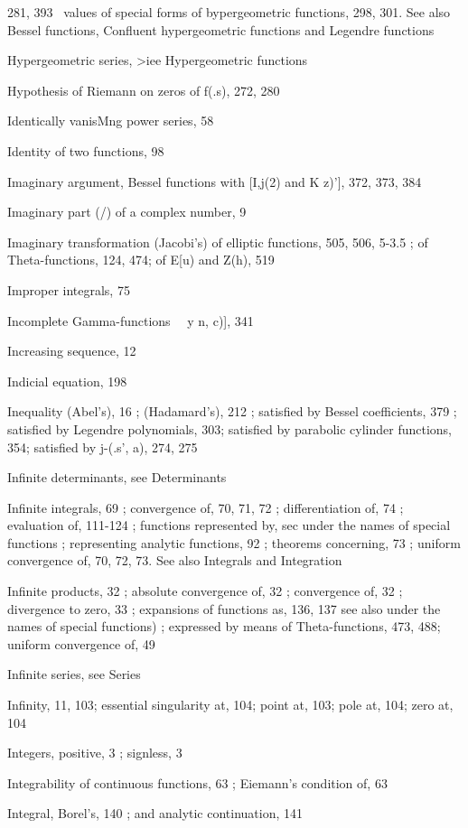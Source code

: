 281, 393 \ values of special forms of bypergeometric functions, 298, 301. See also Bessel
functions, Confluent hypergeometric functions and Legendre functions

Hypergeometric series, >iee Hypergeometric functions

Hypothesis of Riemann on zeros of f(.s), 272, 280

Identically vanisMng power series, 58

Identity of two functions, 98

Imaginary argument, Bessel functions with [I,j(2) and K  z)'], 372, 373, 384

Imaginary part (/) of a complex number, 9

Imaginary transformation (Jacobi's) of elliptic functions, 505, 506, 5-3.5 ; of Theta-functions, 124,
474; of E[u) and Z(h), 519

Improper integrals, 75

Incomplete Gamma-functions \ \  y n, c)], 341

Increasing sequence, 12

Indicial equation, 198

Inequality (Abel's), 16 ; (Hadamard's), 212 ; satisfied by Bessel coefficients, 379 ; satisfied by
Legendre polynomials, 303; satisfied by parabolic cylinder functions, 354; satisfied by
j-(.s', a), 274, 275

Infinite determinants, see Determinants

Infinite integrals, 69 ; convergence of, 70, 71, 72 ; differentiation of, 74 ; evaluation of, 111-124 ;
functions represented by, sec under the names of special functions ; representing analytic
functions, 92 ; theorems concerning, 73 ; uniform convergence of, 70, 72, 73. See also
Integrals and Integration

Infinite products, 32 ; absolute convergence of, 32 ; convergence of, 32 ; divergence to zero, 33 ;
expansions of functions as, 136, 137  see also under the names of special functions) ; expressed
by means of Theta-functions, 473, 488; uniform convergence of, 49

Infinite series, see Series

Infinity, 11, 103; essential singularity at, 104; point at, 103; pole at, 104; zero at, 104

Integers, positive, 3 ; signless, 3

Integrability of continuous functions, 63 ; Eiemann's condition of, 63

Integral, Borel's, 140 ; and analytic continuation, 141

